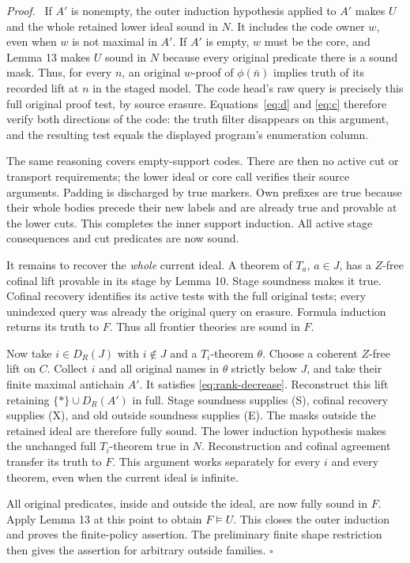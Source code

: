 \documentclass[11pt]{article}
\newcommand{\qed}{\hfill\ensuremath{\square}}
\newenvironment{proof}{\par\emph{Proof.}\ }{\qed\par}
\begin{document}
\begin{proof}
If $A'$ is nonempty, the outer induction hypothesis applied to
$A'$ makes $U$ and the whole retained lower ideal sound in $N$.
It includes the code owner $w$, even when $w$ is not maximal in
$A'$. If $A'$ is empty, $w$ must be the core, and Lemma 13 makes
$U$ sound in $N$ because every original predicate there is a sound
mask. Thus, for every $n$, an original $w$-proof of $\phi(\bar n)$
implies truth of its recorded lift at $n$ in the staged model.
The code head's raw query is precisely this full original proof
test, by source erasure. Equations~\eqref{eq:d} and \eqref{eq:c}
therefore verify both directions of the code: the truth filter
disappears on this argument, and the resulting test equals the
displayed program's enumeration column.

The same reasoning covers empty-support codes. There are then no
active cut or transport requirements; the lower ideal or core call
verifies their source arguments. Padding is discharged by true
markers. Own prefixes are true because their whole bodies precede
their new labels and are already true and provable at the lower
cuts. This completes the inner support induction. All active
stage consequences and cut predicates are now sound.

It remains to recover the \emph{whole} current ideal. A theorem of
$T_a$, $a\in J$, has a $Z$-free cofinal lift provable in its stage
by Lemma 10. Stage soundness makes it true. Cofinal recovery
identifies its active tests with the full original tests; every
unindexed query was already the original query on erasure.
Formula induction returns its truth to $F$. Thus all frontier
theories are sound in $F$.

Now take $i\in D_R(J)$ with $i\notin J$ and a $T_i$-theorem $\theta$.
Choose a coherent $Z$-free lift on $C$. Collect $i$ and all original
names in $\theta$ strictly below $J$, and take their finite maximal
antichain $A'$. It satisfies \eqref{eq:rank-decrease}. Reconstruct
this lift retaining $\{*\}\cup D_R(A')$ in full. Stage soundness
supplies (S), cofinal recovery supplies (X), and old outside
soundness supplies (E). The masks outside the retained ideal are
therefore fully sound. The lower induction hypothesis makes the
unchanged full $T_i$-theorem true in $N$. Reconstruction and
cofinal agreement transfer its truth to $F$. This argument works
separately for every $i$ and every theorem, even when the current
ideal is infinite.

All original predicates, inside and outside the ideal, are now
fully sound in $F$. Apply Lemma 13 at this point to obtain
$F\models U$. This closes the outer induction and proves the
finite-policy assertion. The preliminary finite shape restriction
then gives the assertion for arbitrary outside families.
\end{proof}
\end{document}

